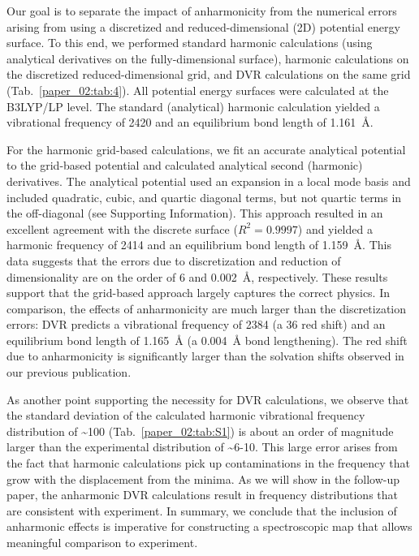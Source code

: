 Our goal is to separate the impact of anharmonicity from the numerical errors arising from using a discretized and reduced-dimensional (2D) potential energy surface. To this end, we performed standard harmonic calculations (using analytical derivatives on the fully-dimensional surface), harmonic calculations on the discretized reduced-dimensional grid, and DVR calculations on the same grid (Tab.~\ref{paper_02:tab:4}). All potential energy surfaces were calculated at the B3LYP/LP level. The standard (analytical) harmonic calculation yielded a vibrational frequency of \SI{2420}{\wavenumber} and an equilibrium bond length of \SI{1.161}{\angstrom}.

For the harmonic grid-based calculations, we fit an accurate analytical potential to the grid-based potential and calculated analytical second (harmonic) derivatives. The analytical potential used an expansion in a local mode basis and included quadratic, cubic, and quartic diagonal terms, but not quartic terms in the off-diagonal (see Supporting Information). This approach resulted in an excellent agreement with the discrete surface (\(R^2 = 0.9997\)) and yielded a harmonic frequency of \SI{2414}{\wavenumber} and an equilibrium  bond length of \SI{1.159}{\angstrom}. This data suggests that the errors due to discretization and reduction of dimensionality are on the order of \SI{6}{\wavenumber} and \SI{0.002}{\angstrom}, respectively. These results support that the grid-based approach largely captures the correct physics. In comparison, the effects of anharmonicity are much larger than the discretization errors: DVR predicts a vibrational frequency of \SI{2384}{\wavenumber} (a \SI{36}{\wavenumber} red shift) and an equilibrium bond length of \SI{1.165}{\angstrom} (a \SI{0.004}{\angstrom} bond lengthening). The red shift due to anharmonicity is significantly larger than the solvation shifts observed in our previous publication.\cite{Brinzer2015}

As another point supporting the necessity for DVR calculations, we observe that the standard deviation of the calculated harmonic vibrational frequency distribution of \textasciitilde{}\SI{100}{\wavenumber} (Tab.~\ref{paper_02:tab:S1}) is about an order of magnitude larger than the experimental distribution of \textasciitilde{}6-\SI{10}{\wavenumber}. This large error arises from the fact that harmonic calculations pick up contaminations in the frequency that grow with the displacement from the minima. As we will show in the follow-up paper,\cite{Daly2016} the anharmonic DVR calculations result in frequency distributions that are consistent with experiment. In summary, we conclude that the inclusion of anharmonic effects is imperative for constructing a spectroscopic map that allows meaningful comparison to experiment.


